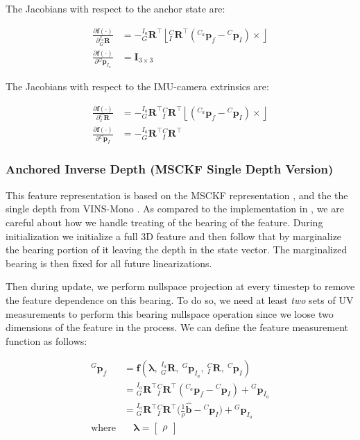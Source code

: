 The Jacobians with respect to the anchor state are\+:

\begin{align*} \frac{\partial \mathbf f(\cdot)}{\partial {}^{I_a}_{G}\mathbf{R}} &= -{}^{I_a}_{G}\mathbf{R}^\top \left\lfloor{}^{C}_{I}\mathbf{R}^\top({}^{C_a}\mathbf{p}_f-{}^{C}\mathbf{p}_{I}) \times\right\rfloor \\ \frac{\partial \mathbf f(\cdot)}{\partial {}^{G}\mathbf{p}_{I_a}} &= \mathbf{I}_{3\times 3} \end{align*}

The Jacobians with respect to the I\+M\+U-\/camera extrinsics are\+:

\begin{align*} \frac{\partial \mathbf f(\cdot)}{\partial {}^{C}_{I}\mathbf{R}} &= -{}^{I_a}_{G}\mathbf{R}^\top{}^{C}_{I}\mathbf{R}^\top \left\lfloor({}^{C_a}\mathbf{p}_f-{}^{C}\mathbf{p}_{I}) \times\right\rfloor \\ \frac{\partial \mathbf f(\cdot)}{\partial {}^{C}\mathbf{p}_{I}} &= -{}^{I_a}_{G}\mathbf{R}^\top{}^{C}_{I}\mathbf{R}^\top \end{align*}\hypertarget{update-feat_feat-rep-anchor-inv3}{}\subsubsection{Anchored Inverse Depth (\+M\+S\+C\+K\+F Single Depth Version)}\label{update-feat_feat-rep-anchor-inv3}
This feature representation is based on the M\+S\+C\+KF representation \cite{Mourikis2007ICRA}, and the the single depth from V\+I\+N\+S-\/\+Mono \cite{Qin2018TRO}. As compared to the implementation in \cite{Qin2018TRO}, we are careful about how we handle treating of the bearing of the feature. During initialization we initialize a full 3D feature and then follow that by marginalize the bearing portion of it leaving the depth in the state vector. The marginalized bearing is then fixed for all future linearizations.

Then during update, we perform nullspace projection at every timestep to remove the feature dependence on this bearing. To do so, we need at least {\itshape two} sets of UV measurements to perform this bearing nullspace operation since we loose two dimensions of the feature in the process. We can define the feature measurement function as follows\+:

\begin{align*} {}^{G}\mathbf{p}_f &= \mathbf f(\boldsymbol\lambda,~{}^{I_a}_{G}\mathbf{R},~{}^{G}\mathbf{p}_{I_a},~{}^{C}_{I}\mathbf{R},~{}^{C}\mathbf{p}_{I}) \\ &= {}^{I_a}_{G}\mathbf{R}^\top{}^{C}_{I}\mathbf{R}^\top({}^{C_a}\mathbf{p}_f-{}^{C}\mathbf{p}_{I}) + {}^{G}\mathbf{p}_{I_a} \\ &= {}^{I_a}_{G}\mathbf{R}^\top{}^{C}_{I}\mathbf{R}^\top\Big(\frac{1}{\rho}\hat{\mathbf{b}}-{}^{C}\mathbf{p}_{I}\Big) + {}^{G}\mathbf{p}_{I_a} \\ \text{where} &\quad \boldsymbol\lambda = \begin{bmatrix} \rho \end{bmatrix} \end{align*}

